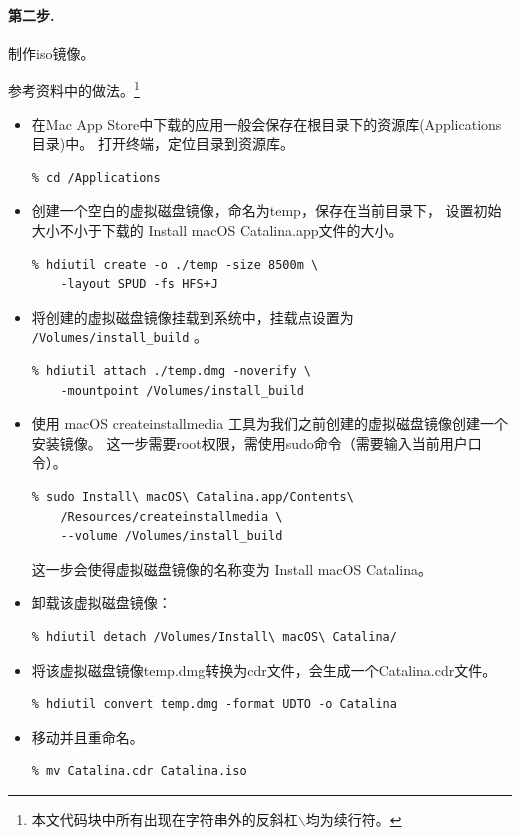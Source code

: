 \documentclass[final]{cvpr}
\newcommand{\mypara}[1]{\paragraph{#1.}}
\begin{document}
\mypara{第二步}  制作iso镜像。

参考资料\cite{Web/installCatalina}中的做法。\footnote{
本文代码块中所有出现在字符串外的反斜杠$\backslash$均为续行符。
}

\begin{itemize}
    \item 在Mac App Store中下载的应用一般会保存在根目录下的资源库(Applications 目录)中。
          打开终端，定位目录到资源库。
\begin{lstlisting}
% cd /Applications
\end{lstlisting}
    \item 创建一个空白的虚拟磁盘镜像，命名为temp，保存在当前目录下，
    设置初始大小不小于下载的 Install macOS Catalina.app文件的大小。
\begin{lstlisting}
% hdiutil create -o ./temp -size 8500m \
    -layout SPUD -fs HFS+J
\end{lstlisting}
    \item 将创建的虚拟磁盘镜像挂载到系统中，挂载点设置为 \lstinline{/Volumes/install_build} 。
\begin{lstlisting}
% hdiutil attach ./temp.dmg -noverify \
    -mountpoint /Volumes/install_build
\end{lstlisting}
    \item 使用 macOS createinstallmedia 工具为我们之前创建的虚拟磁盘镜像创建一个安装镜像。
    这一步需要root权限，需使用sudo命令（需要输入当前用户口令）。
\begin{lstlisting}
% sudo Install\ macOS\ Catalina.app/Contents\
    /Resources/createinstallmedia \
    --volume /Volumes/install_build 
\end{lstlisting}
    这一步会使得虚拟磁盘镜像的名称变为 Install macOS Catalina。
    \item 卸载该虚拟磁盘镜像：
\begin{lstlisting}
% hdiutil detach /Volumes/Install\ macOS\ Catalina/
\end{lstlisting}
    \item 将该虚拟磁盘镜像temp.dmg转换为cdr文件，会生成一个Catalina.cdr文件。
\begin{lstlisting}
% hdiutil convert temp.dmg -format UDTO -o Catalina
\end{lstlisting}
    \item 移动并且重命名。
\begin{lstlisting}
% mv Catalina.cdr Catalina.iso
\end{lstlisting}
\end{itemize}
\end{document}
